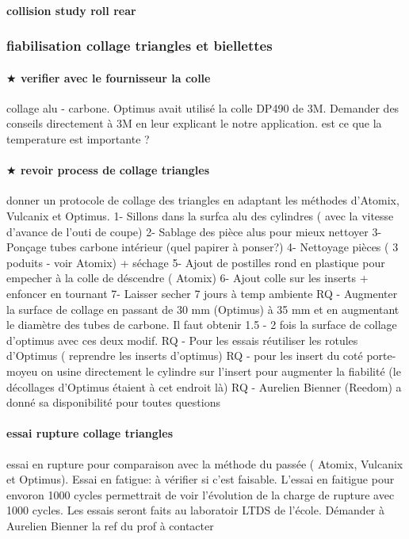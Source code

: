 			\paragraph{collision study roll rear} 
		\subsubsection*{fiabilisation collage triangles et biellettes} 
 \par 
			\paragraph{$\bigstar$ verifier avec le fournisseur la colle} collage alu - carbone. Optimus avait utilisé la colle DP490 de 3M. Demander des conseils directement à 3M en leur explicant le notre application. est ce que la temperature est importante ?
			\paragraph{$\bigstar$ revoir process de collage triangles} donner un protocole de collage des triangles en adaptant les méthodes d'Atomix, Vulcanix et Optimus. 
1- Sillons dans la surfca alu des cylindres ( avec la vitesse d'avance de l'outi de coupe) 
2- Sablage des pièce alus pour mieux nettoyer
3- Ponçage tubes carbone intérieur (quel papirer à ponser?)
4- Nettoyage pièces ( 3 poduits - voir Atomix) + séchage
5- Ajout de postilles rond en plastique pour empecher à la colle de déscendre ( Atomix)
6- Ajout colle sur les inserts + enfoncer en tournant
7- Laisser secher 7 jours à temp ambiente
RQ - Augmenter la surface de collage en passant de 30 mm (Optimus) à 35 mm et en augmentant le diamètre des tubes de carbone. Il faut obtenir 1.5 - 2 fois la surface de collage d'optimus avec ces deux modif.
RQ - Pour les essais réutiliser les rotules d'Optimus ( reprendre les inserts d'optimus)
RQ - pour les insert du coté porte-moyeu on usine directement le cylindre sur l'insert pour augmenter la fiabilité (le décollages d'Optimus étaient à cet endroit là)
RQ - Aurelien Bienner (Reedom) a donné sa disponibilité pour toutes questions
			\paragraph{essai rupture collage triangles} essai en rupture pour comparaison avec la méthode du passée ( Atomix, Vulcanix et Optimus). Essai en fatigue: à vérifier si c'est faisable. L'essai en faitigue pour envoron 1000 cycles permettrait de voir l'évolution de la charge de rupture avec 1000 cycles. Les essais seront faits au laboratoir LTDS de l'école. Démander à Aurelien Bienner la ref du prof à contacter
